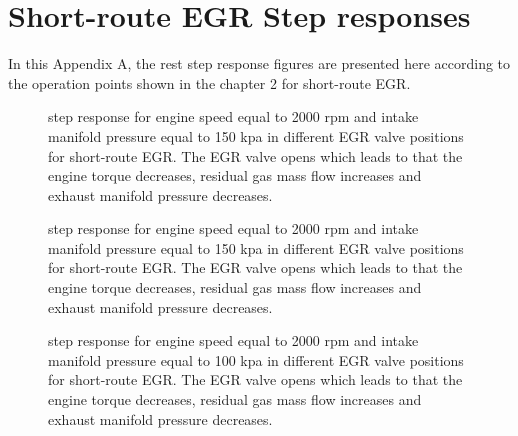 \chapter{Short-route EGR Step responses}\label{cha:basic_short}
In this Appendix A, the rest step response figures are presented here according to the operation points shown in the chapter 2 for short-route EGR.

\begin{figure}[tbp]
  \centering
  \qquad
  \caption{\label{fig:step_response_short_2000_150_1}%
    step response for engine speed equal to 2000 rpm and intake manifold pressure equal to 150 kpa in different EGR valve positions for short-route EGR. The EGR valve opens which leads to that the engine torque decreases, residual gas mass flow increases and exhaust manifold pressure decreases.}
\end{figure}

\begin{figure}[tbp]
  \centering
  \qquad
  \caption{\label{fig:step_response_short_2000_150_2}%
    step response for engine speed equal to 2000 rpm and intake manifold pressure equal to 150 kpa in different EGR valve positions for short-route EGR. The EGR valve opens which leads to that the engine torque decreases, residual gas mass flow increases and exhaust manifold pressure decreases.}
\end{figure}

\begin{figure}[tbp]
  \centering
  \qquad
  \caption{\label{fig:step_response_short_2000_100_1}%
    step response for engine speed equal to 2000 rpm and intake manifold pressure equal to 100 kpa in different EGR valve positions for short-route EGR. The EGR valve opens which leads to that the engine torque decreases, residual gas mass flow increases and exhaust manifold pressure decreases.}
\end{figure}

